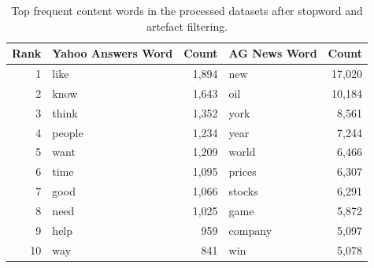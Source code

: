 \begin{table}[H]
\centering
\caption{Top frequent content words in the processed datasets after stopword and artefact filtering.}
\label{tab:top_frequent_words}
\begin{tabular}{r l r l r}
\toprule
Rank & Yahoo Answers Word & Count & AG News Word & Count \\
\midrule
1 & like & 1,894 & new & 17,020 \\
2 & know & 1,643 & oil & 10,184 \\
3 & think & 1,352 & york & 8,561 \\
4 & people & 1,234 & year & 7,244 \\
5 & want & 1,209 & world & 6,466 \\
6 & time & 1,095 & prices & 6,307 \\
7 & good & 1,066 & stocks & 6,291 \\
8 & need & 1,025 & game & 5,872 \\
9 & help & 959 & company & 5,097 \\
10 & way & 841 & win & 5,078 \\
\bottomrule
\end{tabular}
\end{table}
